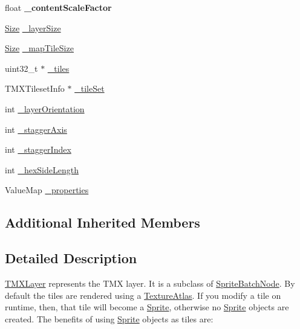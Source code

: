 \begin{DoxyCompactItemize}
\item 
\mbox{\label{classTMXLayer_a50de2ff95187aff763550c582f6bcf31}} 
float {\bfseries \+\_\+content\+Scale\+Factor}
\item 
\hyperlink{classSize}{Size} \hyperlink{classTMXLayer_a994e928975bb81ce6a5f05170149a9eb}{\+\_\+layer\+Size}
\item 
\hyperlink{classSize}{Size} \hyperlink{classTMXLayer_a307d65856e767871ec81f9c456a2401e}{\+\_\+map\+Tile\+Size}
\item 
uint32\+\_\+t $\ast$ \hyperlink{classTMXLayer_a61e9c6961caaa162e77168cc7166d8de}{\+\_\+tiles}
\item 
T\+M\+X\+Tileset\+Info $\ast$ \hyperlink{classTMXLayer_a19b5b98c2f7a6018e66752b0df696cec}{\+\_\+tile\+Set}
\item 
int \hyperlink{classTMXLayer_af42f7e450205e2758911253875a999d3}{\+\_\+layer\+Orientation}
\item 
int \hyperlink{classTMXLayer_a24f8fdd44cf37f43dae15cbdc509933a}{\+\_\+stagger\+Axis}
\item 
int \hyperlink{classTMXLayer_a661239e6226feb85700c856c1c379273}{\+\_\+stagger\+Index}
\item 
int \hyperlink{classTMXLayer_a976dd9876f195fbb8b5cf4137ad85851}{\+\_\+hex\+Side\+Length}
\item 
Value\+Map \hyperlink{classTMXLayer_a8275cd1a7a60db259c4e54801acd8381}{\+\_\+properties}
\end{DoxyCompactItemize}
\subsection*{Additional Inherited Members}


\subsection{Detailed Description}
\hyperlink{classTMXLayer}{T\+M\+X\+Layer} represents the T\+MX layer. It is a subclass of \hyperlink{classSpriteBatchNode}{Sprite\+Batch\+Node}. By default the tiles are rendered using a \hyperlink{classTextureAtlas}{Texture\+Atlas}. If you modify a tile on runtime, then, that tile will become a \hyperlink{classSprite}{Sprite}, otherwise no \hyperlink{classSprite}{Sprite} objects are created. The benefits of using \hyperlink{classSprite}{Sprite} objects as tiles are\+: 


